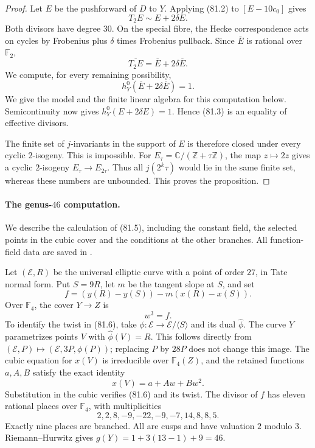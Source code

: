 \begin{proof}
Let $E$ be the pushforward of $D$ to $Y$. Applying (81.2) to
$[E-10c_0]$ gives
\[
                   T_2E\sim E+2\delta E.                \tag{81.3}
\]
Both divisors have degree $30$. On the special fibre, the Hecke
correspondence acts on cycles by Frobenius plus $\delta$ times
Frobenius pullback. Since $\overline E$ is rational over $\mathbb F_2$,
\[
              \overline{T_2E}=\overline E+2\delta\overline E.
                                                               \tag{81.4}
\]
We compute, for every remaining possibility,
\[
              h^0_Y(\overline E+2\delta\overline E)=1.   \tag{81.5}
\]
We give the model and the finite linear algebra for this computation
below. Semicontinuity now gives $h^0_Y(E+2\delta E)=1$. Hence (81.3)
is an equality of effective divisors.

The finite set of $j$-invariants in the support of $E$ is therefore
closed under every cyclic $2$-isogeny. This is impossible. For
$E_\tau=\mathbb C/(\mathbb Z+\tau\mathbb Z)$, the map $z\mapsto2z$
gives a cyclic $2$-isogeny $E_\tau\longrightarrow E_{2\tau}$.
Thus all $j(2^k\tau)$
would lie in the same finite set, whereas these numbers are unbounded.
This proves the proposition.
\end{proof}

\paragraph{The genus-$46$ computation.}
We describe the calculation of (81.5), including the constant field,
the selected points in the cubic cover and the conditions at the
other branches. All function-field data are saved in
.

Let $(\mathcal E,R)$ be the universal elliptic curve with a point of
order $27$, in Tate normal form. Put $S=9R$, let $m$ be the tangent
slope at $S$, and set
\[
                f=(y(R)-y(S))-m(x(R)-x(S)).
\]
Over $\mathbb F_4$, the cover $Y\longrightarrow Z$ is
\[
                         w^3=f.                         \tag{81.6}
\]
To identify the twist in (81.6), take
$\phi:\mathcal E\longrightarrow\mathcal E/\langle S\rangle$ and
its dual $\widehat\phi$. The curve $Y$ parametrizes points $V$ with
$\widehat\phi(V)=R$. This follows directly from
$(\mathcal E,P)\mapsto(\mathcal E,3P,\phi(P))$; replacing $P$ by
$28P$ does not change this image. The cubic equation for
$x(V)$ is irreducible over $\mathbb F_4(Z)$, and the retained
functions $a,A,B$ satisfy the exact identity
\[
                         x(V)=a+Aw+Bw^2.
\]
Substitution in the cubic verifies (81.6) and its twist. The divisor
of $f$ has eleven rational places over $\mathbb F_4$, with
multiplicities
\[
             2,2,8,-9,-22,-9,-7,14,8,8,5.
\]
Exactly nine places are branched. All are cusps and have valuation
$2$ modulo $3$. Riemann--Hurwitz gives
$g(Y)=1+3(13-1)+9=46$.

